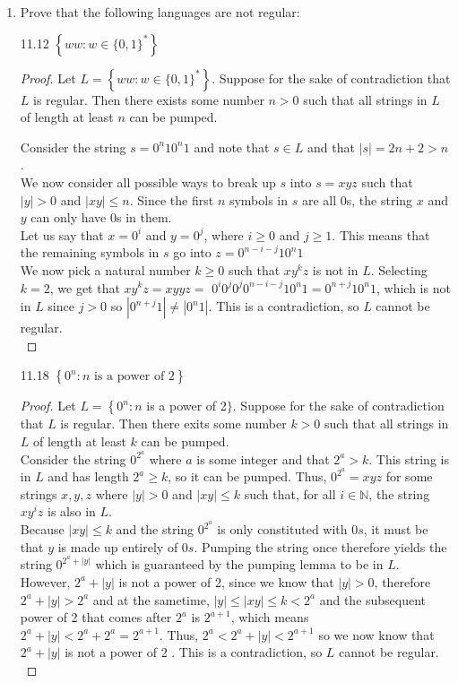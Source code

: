 \documentclass[10pt]{article}
\begin{document}
\begin{enumerate}[label={}]
      \item Prove that the following languages are not regular:

            11.12 $\left\{w w: w \in\{0,1\}^*\right\}$
            \begin{proof}
                  Let $L=\left\{w w: w \in\{0,1\}^*\right\}$. Suppose for the sake of contradiction that $L$ is regular. Then there exists some number $n>0$ such that all strings in $L$ of length at least $n$ can be pumped.

                  Consider the string $s=0^n10^n1$ and note that $s \in L$ and that $|s|=2 n+2>n$.\\
                  We now consider all possible ways to break up $s$ into $s=x y z$ such that $|y|>0$ and $|x y| \leq n$. Since the first $n$ symbols in $s$ are all 0s, the string $x$ and $y$ can only have $0$s in them.\\
                  Let us say that $x=0^i$ and $y=0^j$, where $i \geq 0$ and $j \geq 1$. This means that the remaining symbols in $s$ go into $z=0^{n-i-j}10^n1$\\
                  We now pick a natural number $k \geq 0$ such that $x y^k z$ is not in $L$. Selecting $k=2$, we get that $x y^k z=x y y z=$ $0^i 0^j 0^j 0^{n-i-j}10^n1=0^{n+j}10^n1$, which is not in $L$ since $j>0$ so $\left|0^{n+j}1\right|\neq\left|0^n1\right|$. This is a contradiction, so $L$ cannot be regular.\\
            \end{proof}

            \newpage

            11.18 $\left\{0^n: n \text { is a power of } 2\right\}$
            \begin{proof}
                  Let $L=\left\{0^n: n\right.$ is a power of 2$\}$. Suppose for the sake of contradiction that $L$ is regular. Then there exits some number $k>0$ such that all strings in $L$ of length at least $k$ can be pumped.\\
                  Consider the string $0^{2^a}$ where $a$ is some integer and that $2^a > k$. This string is in $L$ and has length $2^a \geq k$, so it can be pumped. Thus, $0^{2^a}=x y z$ for some strings $x, y, z$ where $|y|>0$ and $|x y| \leq k$ such that, for all $i \in \mathbb{N}$, the string $x y^i z$ is also in $L$.\\
                  Because $|x y| \leq k$ and the string $0^{2^a}$ is only constituted with $0 s$, it must be that $y$ is made up entirely of $0s$. Pumping the string once therefore yields the string $0^{2^a+|y|}$ which is guaranteed by the pumping lemma to be in $L$. However, $2^a+|y|$ is not a power of 2, since we know that $|y|>0$, therefore $2^a+|y|>2^a$ and at the sametime, $|y| \leq|x y| \leq k < 2^a$ and the subsequent power of 2 that comes after $2^a$ is $2^{a+1}$, which means $2^a+|y|<2^a+2^a=2^{a+1}$. Thus, $2^a<2^a+|y|<2^{a+1}$ so we now know that $2^a+|y|$ is not a power of 2 . This is a contradiction, so $L$ cannot be regular.\\
            \end{proof}



\end{enumerate}
\end{document}
